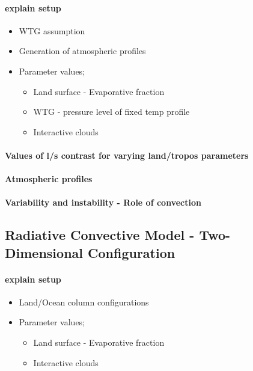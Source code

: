 \paragraph{explain setup}
\begin{itemize}
	\item WTG assumption
	\item Generation of atmospheric profiles
	\item Parameter values;
		\begin{itemize}
			\item Land surface - Evaporative fraction
			\item WTG - pressure level of fixed temp profile
			\item Interactive clouds
		\end{itemize}
\end{itemize}
\paragraph{Values of l/s contrast for varying land/tropos parameters}
\paragraph{Atmospheric profiles}
\paragraph{Variability and instability - Role of convection}


\subsection{Radiative Convective Model - Two-Dimensional Configuration}

\paragraph{explain setup}
\begin{itemize}
	\item Land/Ocean column configurations
	\item Parameter values;
		\begin{itemize}
			\item Land surface - Evaporative fraction
			\item Interactive clouds
		\end{itemize}
\end{itemize}


